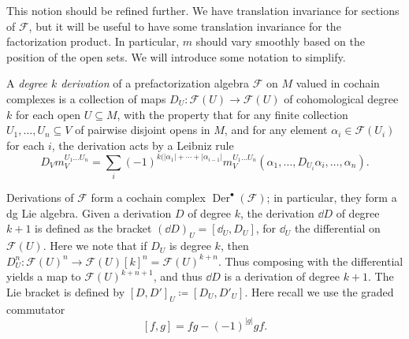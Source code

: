 This notion should be refined further. We have translation invariance for sections of $\mathcal{F} $, but it will be useful to have some translation invariance for the factorization product. In particular, $m$ should vary smoothly based on the position of the open sets. We will introduce some notation to simplify.

\begin{definition}\label{dfn:derivation-of-pfa}
	A \emph{degree $k$ derivation} of a prefactorization algebra $\mathcal{F} $ on $M$ valued in cochain complexes is a collection of maps $D_U : \mathcal{F} (U) \to \mathcal{F} (U)$ of cohomological degree $k$ for each open $U\subseteq M$, with the property that for any finite collection $U_1, \ldots ,U_n \subseteq V$ of pairwise disjoint opens in $M$, and for any element $\alpha _i\in \mathcal{F} (U_i)$ for each $i$, the derivation acts by a Leibniz rule
	\[
		D_Vm_V^{U_1 \ldots U_n} =\sum_{i}(-1)^{k(\left| \alpha _1 \right| + \cdots + \left| \alpha _{i-1}  \right| } m_V^{U_1 \ldots U_n} (\alpha _1, \ldots ,D_{U_i} \alpha _i, \ldots ,\alpha _n)
	.\]
\end{definition}

Derivations of $\mathcal{F} $ form a cochain complex $\operatorname{Der}^{\bullet} (\mathcal{F} )$; in particular, they form a dg Lie algebra. Given a derivation $D$ of degree $k$, the derivation $\dd D$ of degree $k+1$ is defined as the bracket $(\dd D)_U=[\dd _U,D_U]$, for $\dd _U$ the differential on $\mathcal{F} (U)$. Here we note that if $D_U$ is degree $k$, then $D_U^n : \mathcal{F} (U)^n \to \mathcal{F} (U)[k]^n=\mathcal{F} (U)^{k+n} $. Thus composing with the differential yields a map to $\mathcal{F} (U)^{k+n+1} $, and thus $\dd D$ is a derivation of degree $k+1$. The Lie bracket is defined by $[D,D']_U \coloneqq [D_U,D'_U]$. Here recall we use the graded commutator
\[
	[f,g] = fg - (-1)^{\left| g \right| } gf
.\]

